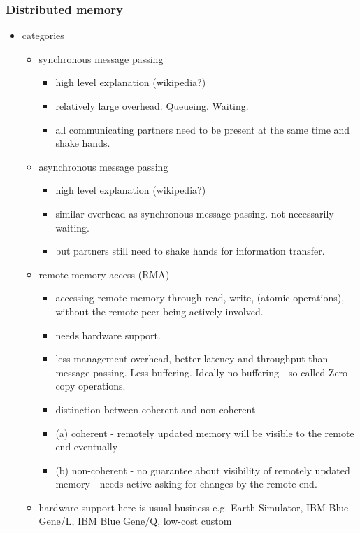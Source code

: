 \documentclass[a4paper, 10pt]{article}
\begin{document}
\begin{enumerate}
\subsubsection{Distributed memory}
\label{sssec:existing-means-distributed}
\begin{itemize}
	\item categories
		\begin{itemize}
			\item synchronous message passing
				\begin{itemize}
					\item high level explanation (wikipedia?)
					\item relatively large overhead. Queueing. Waiting.
					\item all communicating partners need to be present at the same time and shake hands.
				\end{itemize}
			\item asynchronous message passing
				\begin{itemize}
					\item high level explanation (wikipedia?)
					\item similar overhead as synchronous message passing. not necessarily waiting.
					\item but partners still need to shake hands for information transfer.
				\end{itemize}
			\item remote memory access (RMA)
				\begin{itemize}
					\item accessing remote memory through read, write, (atomic operations), without the remote peer being actively involved.
					\item needs hardware support.
					\item less management overhead, better latency and throughput than message passing. Less buffering. Ideally no buffering - so called Zero-copy operations.
					\item distinction between coherent and non-coherent
					\item (a) coherent - remotely updated memory will be visible to the remote end eventually
					\item (b) non-coherent - no guarantee about visibility of remotely updated memory - needs active asking for changes by the remote end.
				\end{itemize}
			\item hardware support here is usual business e.g. Earth Simulator\cite{earthsimulator}, IBM Blue Gene/L\cite{bluegenel}, IBM Blue Gene/Q\cite{bluegeneq}, low-cost custom\cite{hoefler2006b}

\end{itemize}
\end{itemize}
\end{enumerate}
\end{document}
